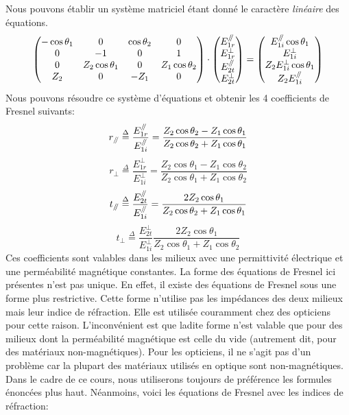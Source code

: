 Nous pouvons établir un système matriciel étant donné le caractère \textit{linéaire} des équations.
	$$
	\begin{pmatrix}
	-\cos \theta_{1} & 0 & \cos \theta_{2}& 0\\
	0 & -1 & 0 & 1\\
	0 & Z_2\cos \theta_{1} & 0 & Z_1\cos \theta_{2}\\ 
	Z_2 & 0 & -Z_1 & 0
	\end{pmatrix}
	\cdot
	\begin{pmatrix}
	E_{1r}^{\mathbin{/\mkern-5mu/}}\\
	E_{1r}^{\perp}\\
	E_{2t}^{\mathbin{/\mkern-5mu/}} \\ 
	E_{2t}^{\perp}
	\end{pmatrix}
	=
	\begin{pmatrix}
	E_{1i}^{\mathbin{/\mkern-5mu/}} \cos \theta_{1}\\
	E_{1i}^{\perp} \\
	Z_2E_{1i}^{\perp} \cos \theta_{1} \\
	Z_2E_{1i}^{\mathbin{/\mkern-5mu/}}
	\end{pmatrix}
	$$
Nous pouvons résoudre ce système d'équations et obtenir les 4 coefficients de Fresnel suivants:
\[r_{\mathbin{/\mkern-5mu/}} \overset{\Delta}= \frac{E_{1r}^{\mathbin{/\mkern-5mu/}}}{E_{1i}^{\mathbin{/\mkern-5mu/}}} = \frac{Z_{2}\cos \theta_{2} - Z_{1} \cos \theta_{1} }{Z_{2} \cos \theta_{2} + Z_{1} \cos \theta_{1} } \]
\[r_{\perp} \overset{\Delta}= \frac{E_{1r}^{\perp}}{E_{1i}^{\perp}} = \frac{Z_{2}\cos \theta_{1} - Z_{1} \cos \theta_{2} }{Z_{2} \cos \theta_{1} + Z_{1} \cos \theta_{2}}\]
\[t_{\mathbin{/\mkern-5mu/}} \overset{\Delta}= \frac{E_{2t}^{\mathbin{/\mkern-5mu/}}}{E_{1i}^{\mathbin{/\mkern-5mu/}}} = \frac{2 Z_{2} \cos \theta_{1} }{Z_{2} \cos \theta_{2} + Z_{1} \cos \theta_{1}} \]
\[t_{\perp} \overset{\Delta}= \frac{E_{2t}^{\perp}}{E_{1i}^{\perp}} \frac{2 Z_{2} \cos \theta_{1} }{Z_{2} \cos \theta_{1} + Z_{1} \cos \theta_{2}}\]
Ces coefficients sont valables dans les milieux avec une permittivité électrique et une perméabilité magnétique constantes. La forme des équations de Fresnel ici présentes n'est pas unique. En effet, il existe des équations de Fresnel sous une forme plus restrictive. Cette forme n'utilise pas les impédances des deux milieux mais leur indice de réfraction. Elle est utilisée couramment chez des opticiens pour cette raison. L'inconvénient est que ladite forme n'est valable que pour des milieux dont la perméabilité magnétique est celle du vide (autrement dit, pour des matériaux non-magnétiques). Pour les opticiens, il ne s'agit pas d'un problème car la plupart des matériaux utilisés en optique sont non-magnétiques. Dans le cadre de ce cours, nous utiliserons toujours de préférence les formules énoncées plus haut. Néanmoins, voici les équations de Fresnel avec les indices de réfraction: 
